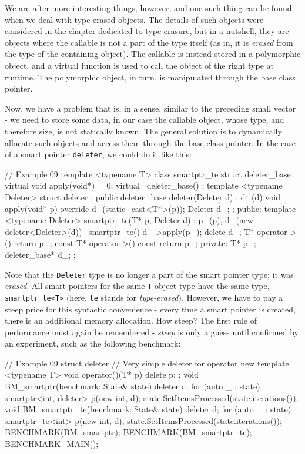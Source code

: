 We are after more interesting things, however, and one such thing can be found when we deal with type-erased objects. The details of such objects were considered in the chapter dedicated to type erasure, but in a nutshell, they are objects where the callable is not a part of the type itself (as in, it is \emph{erased} from the type of the containing object). The callable is instead stored in a polymorphic object, and a virtual function is used to call the object of the right type at runtime. The polymorphic object, in turn, is manipulated through the base class pointer.

Now, we have a problem that is, in a sense, similar to the preceding small vector - we need to store some data, in our case the callable object, whose type, and therefore size, is not statically known. The general solution is to dynamically allocate such objects and access them through the base class pointer. In the case of a smart pointer \texttt{deleter}, we could do it like this:

\begin{code}
// Example 09
template <typename T> class smartptr_te {
  struct deleter_base {
    virtual void apply(void*) = 0;
    virtual ~deleter_base() {}
  };
  template <typename Deleter>
  struct deleter : public deleter_base {
    deleter(Deleter d) : d_(d) {}
    void apply(void* p) override {
      d_(static_cast<T*>(p));
    }
    Deleter d_;
  };
  public:
  template <typename Deleter>
  smartptr_te(T* p, Deleter d) : p_(p),
    d_(new deleter<Deleter>(d)) {}
  ~smartptr_te() {
    d_->apply(p_);
    delete d_;
  }
  T* operator->() { return p_; }
  const T* operator->() const { return p_; }
  private:
  T* p_;
  deleter_base* d_;
};
\end{code}

Note that the \texttt{Deleter} type is no longer a part of the smart pointer type; it was \emph{erased}. All smart pointers for the same \texttt{T} object type have the same type, \texttt{smartptr\_te\textless{}T\textgreater{}} (here, \texttt{te} stands for \emph{type-erased}). However, we have to pay a steep price for this syntactic convenience - every time a smart pointer is created, there is an additional memory allocation. How steep? The first rule of performance must again be remembered - \emph{steep} is only a guess until confirmed by an experiment, such as the following benchmark:

\begin{code}
// Example 09
struct deleter {    // Very simple deleter for operator new
  template <typename T> void operator()(T* p) { delete p; }
};
void BM_smartptr(benchmark::State& state) {
  deleter d;
  for (auto _ : state) {
    smartptr<int, deleter> p(new int, d);
  }
  state.SetItemsProcessed(state.iterations());
}
void BM_smartptr_te(benchmark::State& state) {
  deleter d;
  for (auto _ : state) {
    smartptr_te<int> p(new int, d);
  }
  state.SetItemsProcessed(state.iterations());
}
BENCHMARK(BM_smartptr);
BENCHMARK(BM_smartptr_te);
BENCHMARK_MAIN();
\end{code}

